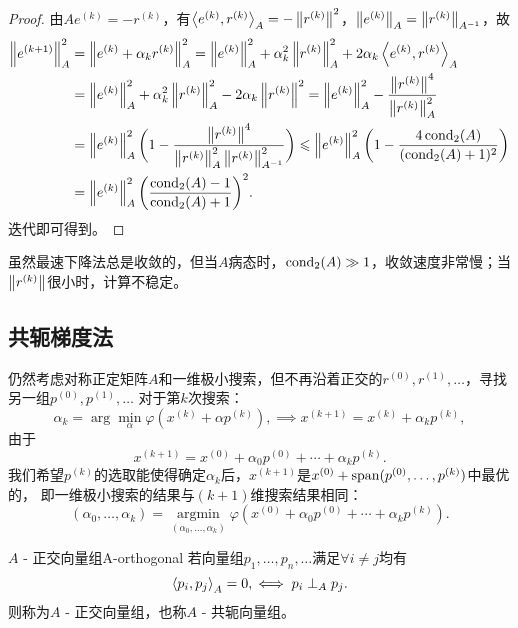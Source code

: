 \begin{proof}
    由$Ae^{(k)}=-r^{(k)}$，有$\left\langle e^{(k)},r^{(k)}\right\rangle_A=-\left\lVert r^{(k)}\right\rVert^2$，$\left\lVert e^{(k)}\right\rVert_A=\left\lVert r^{(k)}\right\rVert_{A^{-1}}$，故
    \begin{align*}
        \left\lVert e^{(k+1)}\right\rVert_A^2&=\left\lVert e^{(k)}+\alpha_kr^{(k)}\right\rVert_A^2
        =\left\lVert e^{(k)}\right\rVert_A^2+\alpha_k^2\left\lVert r^{(k)}\right\rVert_A^2+2\alpha_k\left\langle e^{(k)},r^{(k)}\right\rangle_A\\
        &=\left\lVert e^{(k)}\right\rVert_A^2+\alpha_k^2\left\lVert r^{(k)}\right\rVert_A^2-2\alpha_k\left\lVert r^{(k)}\right\rVert^2=
        \left\lVert e^{(k)}\right\rVert_A^2-\frac{\left\lVert r^{(k)}\right\rVert^4}{\left\lVert r^{(k)}\right\rVert_A^2}\\
        &=\left\lVert e^{(k)}\right\rVert_A^2\biggl(1-\frac{\left\lVert r^{(k)}\right\rVert^4}{\left\lVert r^{(k)}\right\rVert_A^2\left\lVert r^{(k)}\right\rVert_{A^{-1}}^2}\biggr)\leqslant\left\lVert e^{(k)}\right\rVert_A^2\biggl(1-\frac{4\operatorname{cond}_2(A)}{(\operatorname{cond}_2(A)+1)^2}\biggr)\\
        &=\left\lVert e^{(k)}\right\rVert_A^2\biggl(\frac{\operatorname{cond}_2(A)-1}{\operatorname{cond}_2(A)+1}\biggr)^2.
    \end{align*}
    迭代即可得到。
\end{proof}

\begin{remark}
    虽然最速下降法总是收敛的，但当$A$病态时，$\operatorname{cond}_2(A)\gg 1$，收敛速度非常慢；当$\left\lVert r^{(k)}\right\rVert$很小时，计算不稳定。
\end{remark}

\subsection{共轭梯度法}
\label{ssec:conjugate gradient method}

仍然考虑对称正定矩阵$A$和一维极小搜索，但不再沿着正交的$r^{(0)},r^{(1)},\ldots$，寻找另一组$p^{(0)},p^{(1)},\ldots$
对于第$k$次搜索：
\[
    \alpha_k=\arg\min_\alpha\varphi(x^{(k)}+\alpha p^{(k)}),\implies
    x^{(k+1)}=x^{(k)}+\alpha_kp^{(k)},
\]
由于
\[
    x^{(k+1)}=x^{(0)}+\alpha_0p^{(0)}+\cdots+\alpha_kp^{(k)}.
\]
我们希望$p^{(k)}$的选取能使得确定$\alpha_k$后，$x^{(k+1)}$是$x^{(0)}+\operatorname{span}(p^{(0)},\ldots,p^{(k)})$中最优的，
即一维极小搜索的结果与$(k+1)$维搜索结果相同：
\[
    (\alpha_0,\ldots,\alpha_k)=\mathop{\arg\min}\limits_{(\alpha_0,\ldots,\alpha_k)}\varphi(x^{(0)}+\alpha_0p^{(0)}+\cdots+\alpha_kp^{(k)}).
\]

\begin{definition}
    {$A$ - 正交向量组}{A-orthogonal}
    若向量组$p_1,\ldots,p_n,\ldots$满足$\forall i\neq j$均有
    \begin{equation}
        \left\langle p_i,p_j\right\rangle_A=0,\iff p_i\perp_A p_j.
    \end{equation}
    则称为$A$ - 正交向量组，也称$A$ - 共轭向量组。
\end{definition}


